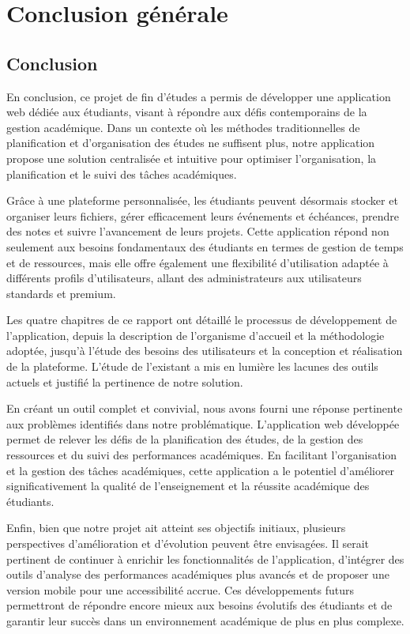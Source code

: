 \chapter*{Conclusion générale}

\section*{Conclusion}

En conclusion, ce projet de fin d’études a permis de développer une application web dédiée aux étudiants, visant à répondre aux défis contemporains de la gestion académique. Dans un contexte où les méthodes traditionnelles de planification et d’organisation des études ne suffisent plus, notre application propose une solution centralisée et intuitive pour optimiser l'organisation, la planification et le suivi des tâches académiques.

Grâce à une plateforme personnalisée, les étudiants peuvent désormais stocker et organiser leurs fichiers, gérer efficacement leurs événements et échéances, prendre des notes et suivre l’avancement de leurs projets. Cette application répond non seulement aux besoins fondamentaux des étudiants en termes de gestion de temps et de ressources, mais elle offre également une flexibilité d’utilisation adaptée à différents profils d’utilisateurs, allant des administrateurs aux utilisateurs standards et premium.

Les quatre chapitres de ce rapport ont détaillé le processus de développement de l’application, depuis la description de l’organisme d’accueil et la méthodologie adoptée, jusqu’à l’étude des besoins des utilisateurs et la conception et réalisation de la plateforme. L’étude de l’existant a mis en lumière les lacunes des outils actuels et justifié la pertinence de notre solution.

En créant un outil complet et convivial, nous avons fourni une réponse pertinente aux problèmes identifiés dans notre problématique. L’application web développée permet de relever les défis de la planification des études, de la gestion des ressources et du suivi des performances académiques. En facilitant l’organisation et la gestion des tâches académiques, cette application a le potentiel d’améliorer significativement la qualité de l’enseignement et la réussite académique des étudiants.

Enfin, bien que notre projet ait atteint ses objectifs initiaux, plusieurs perspectives d’amélioration et d’évolution peuvent être envisagées. Il serait pertinent de continuer à enrichir les fonctionnalités de l’application, d’intégrer des outils d’analyse des performances académiques plus avancés et de proposer une version mobile pour une accessibilité accrue. Ces développements futurs permettront de répondre encore mieux aux besoins évolutifs des étudiants et de garantir leur succès dans un environnement académique de plus en plus complexe.

